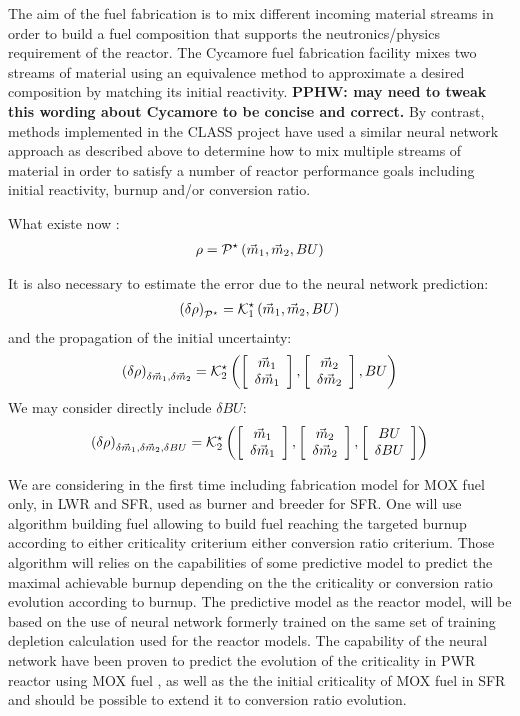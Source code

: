 \documentclass[dvips,12pt]{article}
\newcommand{\unc}[1]
{ \delta #1 }
\newcommand{\uncvector}[1]
{ \left[ \begin{array}{c} #1 \\ \delta #1 \end{array} \right] }
\newcommand{\comment}[1]
{{\bfseries \color{red} #1}}
\begin{document}
The aim of the fuel fabrication is to mix
different incoming material streams in order to
build a fuel composition that supports the
neutronics/physics requirement of the reactor. The
Cycamore fuel fabrication facility mixes two
streams of material using an equivalence method to
approximate a desired composition by matching its
initial reactivity.  \cite{cycamore_fab}
\comment{PPHW: may need to tweak this wording
  about Cycamore to be concise and correct.}  By
contrast, methods implemented in the CLASS project
have used a similar neural network approach as
described above to determine how to mix multiple
streams of material in order to satisfy a number
of reactor performance goals including initial
reactivity, burnup and/or conversion ratio.


What existe now :
\begin{align}
  \rho = {\cal P^{\star}}\left( \vec{m}_{1},\vec{m}_{2}, BU \right)
\end{align}

It is also necessary to estimate the error due to
the neural network prediction:
\begin{align}
  \left(\unc{\rho}\right)_{\cal P^\star} = {\cal K}_1^{\star}\left( \vec{m}_{1},\vec{m}_{2}, BU \right)
\end{align}
and the propagation of the initial uncertainty:
\begin{align}
  \left(\unc{\rho}\right)_{\unc{\vec{m}_{1}},\unc{\vec{m}_{2}}} = {\cal K}^{\star}_2\left( \uncvector{\vec{m}_{1}},\uncvector{\vec{m}_{2}}, BU \right)
\end{align}
We may consider directly include $\delta BU$:
\begin{align}
  \left(\unc{\rho}\right)_{\unc{\vec{m}_{1}},\unc{\vec{m}_{2}},\unc{BU}} = {\cal K}^{\star}_2\left( \uncvector{\vec{m}_{1}},\uncvector{\vec{m}_{2}}, \uncvector{BU} \right)
\end{align}

We are considering in the first time including
fabrication model for MOX fuel only, in LWR and
SFR, used as burner and breeder for SFR. One will
use algorithm building fuel allowing to build fuel
reaching the targeted burnup according to either
criticality criterium either conversion ratio
criterium.  Those algorithm will relies on the
capabilities of some predictive model to predict
the maximal achievable burnup depending on the the
criticality or conversion ratio evolution
according to burnup.  The predictive model as the
reactor model, will be based on the use of neural
network formerly trained on the same set of
training depletion calculation used for the
reactor models. The capability of the neural
network have been proven to predict the evolution
of the criticality in PWR reactor using MOX fuel
\cite{Leniaux.NN, CLASS_UserManual}, as well as
the the initial criticality of MOX fuel in SFR
\cite{CLASS UserManual} and should be possible to
extend it to conversion ratio evolution.
\end{document}
